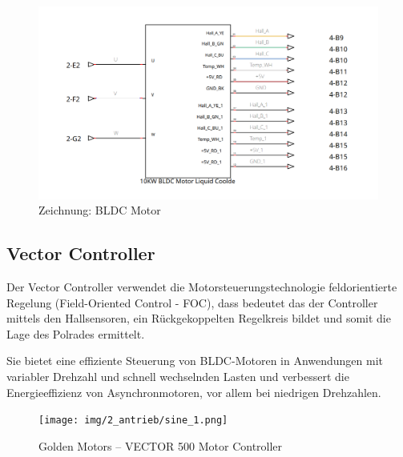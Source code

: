 \begin{figure}[ht]
	\begin{center}
		\includegraphics[width=\textwidth]{img/2_imp/2_circ_bldc_motor.png}
		\caption{Zeichnung: BLDC Motor}
		\label{img_2_2:circ_bldc:1}
	\end{center}
\end{figure}
\newpage



\subsection{Vector Controller}
Der Vector Controller verwendet die Motorsteuerungstechnologie feldorientierte Regelung (Field-Oriented Control - FOC), dass bedeutet das der Controller mittels den Hallsensoren, ein Rückgekoppelten Regelkreis bildet und somit die Lage des Polrades ermittelt.

\cite{schroeder:elektische_antriebe}

Sie bietet eine effiziente Steuerung von BLDC-Motoren in Anwendungen mit variabler Drehzahl und schnell wechselnden Lasten und verbessert die Energieeffizienz von Asynchronmotoren, vor allem bei niedrigen Drehzahlen.


\begin{figure}[ht]
	\begin{center}
		\texttt{[image: img/2\_antrieb/sine\_1.png]}
		\caption{Golden Motors – VECTOR 500 Motor Controller}
		\label{img_2_2:antrieb_sine:1}
	\end{center}
\end{figure}



